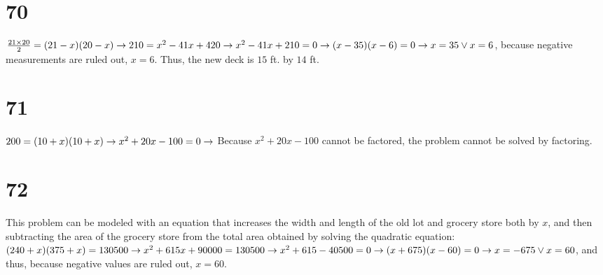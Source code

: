 \documentclass{article}
\theoremstyle{definition}
\begin{document}
\section*{70}
$\frac{21\times 20}{2}=(21-x)(20-x)\newline\rightarrow 210=x^2-41x+420\newline\rightarrow x^2-41x+210=0\newline\rightarrow (x-35)(x-6)=0\newline\rightarrow 
x=35\vee x=6$, because negative measurements are ruled out, $x=6$. Thus, the new deck is $15$ ft. by $14$ ft.

\section*{71}
$200=(10+x)(10+x)\newline\rightarrow x^2+20x-100=0\newline\rightarrow$ Because $x^2+20x-100$ cannot be factored, 
the problem cannot be solved by factoring. 

\section*{72}
This problem can be modeled with an equation that increases the width and length of the old lot and grocery store both by $x$, and then subtracting the 
area of the grocery store from the total area obtained by solving the quadratic equation:\newline
$(240+x)(375+x)=130500\newline\rightarrow x^2+615x+90000=130500\newline\rightarrow x^2+615-40500=0\newline\rightarrow (x+675)(x-60)=0\newline\rightarrow 
x=-675\vee x=60$, and thus, because negative values are ruled out, $x=60$.
\end{document}
